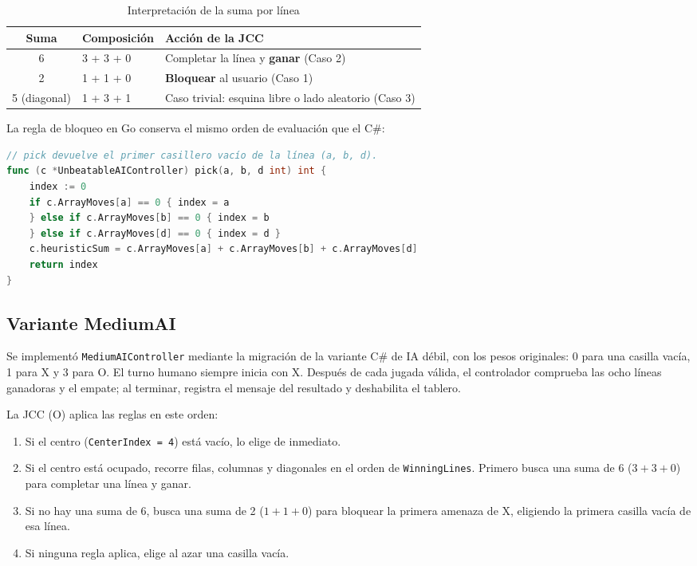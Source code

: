 \documentclass[12pt,a4paper]{article}
\begin{document}
\begin{table}[H]
\centering
\caption{Interpretación de la suma por línea}
\begin{tabular}{cll}
\toprule
\textbf{Suma} & \textbf{Composición} & \textbf{Acción de la JCC}\\
\midrule
6 & 3 + 3 + 0 & Completar la línea y \textbf{ganar} (Caso 2)\\
2 & 1 + 1 + 0 & \textbf{Bloquear} al usuario (Caso 1)\\
5 (diagonal) & 1 + 3 + 1 & Caso trivial: esquina libre o lado aleatorio (Caso 3)\\
\bottomrule
\end{tabular}
\end{table}

La regla de bloqueo en Go conserva el mismo orden de evaluación que el C\#:

\begin{lstlisting}[language=Go]
// pick devuelve el primer casillero vacío de la línea (a, b, d).
func (c *UnbeatableAIController) pick(a, b, d int) int {
	index := 0
	if c.ArrayMoves[a] == 0 { index = a
	} else if c.ArrayMoves[b] == 0 { index = b
	} else if c.ArrayMoves[d] == 0 { index = d }
	c.heuristicSum = c.ArrayMoves[a] + c.ArrayMoves[b] + c.ArrayMoves[d]
	return index
}
\end{lstlisting}


\subsection{Variante MediumAI}
Se implementó \texttt{MediumAIController} mediante la migración de la variante
C\# de IA débil, con los pesos originales: 0 para una casilla vac\'ia, 1 para X y 3 para O. El turno
humano siempre inicia con X. Despu\'es de cada jugada v\'alida, el controlador
comprueba las ocho l\'ineas ganadoras y el empate; al terminar, registra el
mensaje del resultado y deshabilita el tablero.

La JCC (O) aplica las reglas en este orden:
\begin{enumerate}
  \item Si el centro (\texttt{CenterIndex = 4}) est\'a vac\'io, lo elige de inmediato.
  \item Si el centro est\'a ocupado, recorre filas, columnas y diagonales en el
        orden de \texttt{WinningLines}. Primero busca una suma de 6
        ($3+3+0$) para completar una l\'inea y ganar.
  \item Si no hay una suma de 6, busca una suma de 2 ($1+1+0$) para bloquear
        la primera amenaza de X, eligiendo la primera casilla vac\'ia de esa l\'inea.
  \item Si ninguna regla aplica, elige al azar una casilla vac\'ia.
\end{enumerate}
\end{document}
